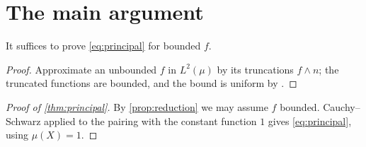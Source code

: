 
\section{The main argument}
\label{sec:main-result}

\begin{proposition}
\label{prop:reduction}
It suffices to prove \cref{eq:principal} for bounded $f$.
\end{proposition}

\begin{proof}
Approximate an unbounded $f$ in $L^2(\mu)$ by its truncations
$f \wedge n$; the truncated functions are bounded, and the bound is
uniform by \cite[Lemma 2.1]{companion-a}.
\end{proof}

\begin{proof}[Proof of \cref{thm:principal}]
By \cref{prop:reduction} we may assume $f$ bounded. Cauchy--Schwarz
applied to the pairing with the constant function $1$ gives
\cref{eq:principal}, using $\mu(X) = 1$.
\end{proof}

